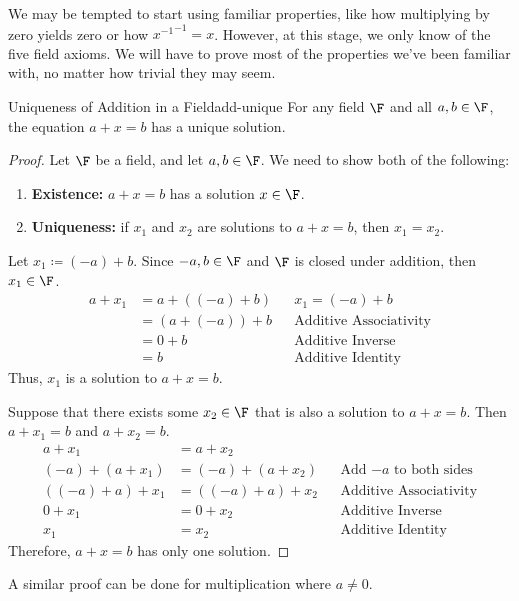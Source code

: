\documentclass[letterpaper,12pt]{report}
\begin{document}
We may be tempted to start using familiar properties, like how multiplying by zero yields zero or how ${x^{-1}}^{-1} = x$. However, at this stage, we only know of the five field axioms. We will have to prove most of the properties we've been familiar with, no matter how trivial they may seem.

\begin{thmbox}{Uniqueness of Addition in a Field}{add-unique}
	For any field $\F$ and all $a,b \in \F$, the equation $a+x=b$ has a unique solution.
	\tcblower
	\begin{proof}
		Let $\F$ be a field, and let $a,b \in \F$. We need to show both of the following:
		\begin{enumerate}
			\item \textbf{Existence:} $a+x=b$ has a solution $x \in \F$.
			\item \textbf{Uniqueness:} if $x_1$ and $x_2$ are solutions to $a+x=b$, then $x_1=x_2$.
		\end{enumerate}

		Let $x_1 \coloneq (-a) + b$. Since $-a, b \in \F$ and $\F$ is closed under addition, then $x_1 \in \F$.
		\begin{align*}
			a + x_1 &= a + ((-a) + b) && x_1=(-a)+b \\
			&= (a + (-a)) + b && \text{Additive Associativity} \\
			&= 0 + b && \text{Additive Inverse} \\
			&= b && \text{Additive Identity}
		\end{align*}
		Thus, $x_1$ is a solution to $a + x = b$.

		Suppose that there exists some $x_2 \in \F$ that is also a solution to $a+x=b$. Then $a+x_1 = b$ and $a+x_2 = b$.
		\begin{align*}
			a + x_1 &= a + x_2 \\
			(-a) + (a + x_1) &= (-a) + (a + x_2) && \text{Add $-a$ to both sides} \\
			((-a) + a) + x_1 &= ((-a) + a) + x_2 && \text{Additive Associativity} \\
			0 + x_1 &= 0 + x_2 && \text{Additive Inverse} \\
			x_1 &= x_2 && \text{Additive Identity}
		\end{align*}
		Therefore, $a+x = b$ has only one solution.
	\end{proof}
\end{thmbox}

A similar proof can be done for multiplication where $a \neq 0$.
\end{document}
